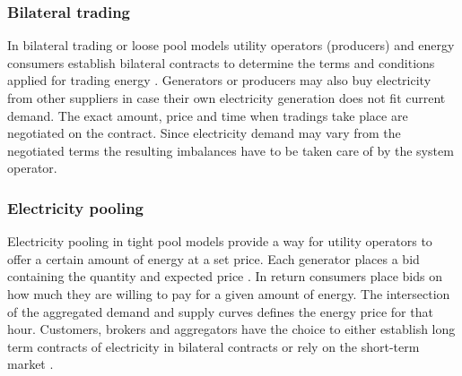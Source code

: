 \subsubsection{Bilateral trading}

In bilateral trading or loose pool models utility operators (producers) and energy consumers establish bilateral contracts to determine the terms and conditions applied for trading energy \cite{onaiwu2009does,chao1999design}. Generators or producers may also buy electricity from other suppliers in case their own electricity generation does not fit current demand. The exact amount, price and time when tradings take place are negotiated on the contract. Since electricity demand may vary from the negotiated terms the resulting imbalances have to be taken care of by the system operator. 

\subsubsection{Electricity pooling}

Electricity pooling in tight pool models provide a way for utility operators to offer a certain amount of energy at a set price. Each generator places a bid containing the quantity and expected price \cite{barroso2005classification}. In return consumers place bids on how much they are willing to pay for a given amount of energy. The intersection of the aggregated demand and supply curves defines the energy price for that hour. 
Customers, brokers and aggregators have the choice to either establish long term contracts of electricity in bilateral contracts or rely on the short-term market \cite{hogan1997reshaping}.








